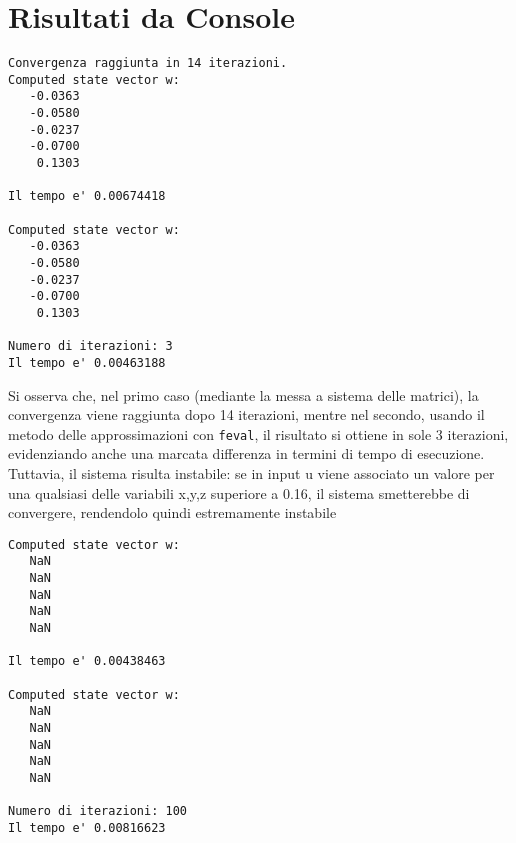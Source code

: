 \documentclass[11pt]{article}
\begin{document}
\section*{Risultati da Console}
\begin{lstlisting}[style=console]
Convergenza raggiunta in 14 iterazioni.
Computed state vector w:
   -0.0363
   -0.0580
   -0.0237
   -0.0700
    0.1303

Il tempo e' 0.00674418 

Computed state vector w:
   -0.0363
   -0.0580
   -0.0237
   -0.0700
    0.1303

Numero di iterazioni: 3
Il tempo e' 0.00463188 
\end{lstlisting}
Si osserva che, nel primo caso (mediante la messa a sistema delle matrici), la convergenza viene raggiunta dopo 14 iterazioni, mentre nel secondo, usando il metodo delle approssimazioni con \texttt{feval}, il risultato si ottiene in sole 3 iterazioni, evidenziando anche una marcata differenza in termini di tempo di esecuzione. \\
Tuttavia, il sistema risulta instabile: se in input u viene associato un valore per una qualsiasi delle variabili x,y,z superiore a 0.16, il sistema smetterebbe di convergere, rendendolo quindi estremamente instabile
\begin{lstlisting}[style=console]
	Computed state vector w:
   NaN
   NaN
   NaN
   NaN
   NaN

Il tempo e' 0.00438463 

Computed state vector w:
   NaN
   NaN
   NaN
   NaN
   NaN

Numero di iterazioni: 100
Il tempo e' 0.00816623 
\end{lstlisting}
\end{document}
